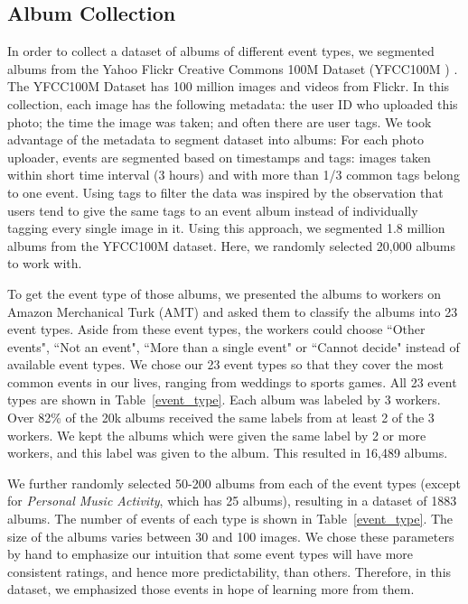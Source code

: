 \documentclass[10pt,twocolumn,letterpaper]{article}
\begin{document}
\subsection{Album Collection}
In order to collect a dataset of albums of different event types, we segmented albums from the Yahoo Flickr Creative Commons 100M Dataset (YFCC100M ) \cite{thomee2015yfcc100m}. The YFCC100M Dataset has 100 million images and videos from Flickr. In this collection, each image has the following metadata: the user ID who uploaded this photo; the time the image was taken; and often there are user tags. We took advantage of the metadata to segment dataset into albums: For each photo uploader, events are segmented based on timestamps and tags: images taken within short time interval (3 hours) and with more than 1/3 common tags belong to one event. Using tags to filter the data was inspired by the observation that users tend to give the same tags to an event album instead of individually tagging every single image in it. Using this approach, we segmented 1.8 million albums from the YFCC100M dataset. Here, we randomly selected 20,000 albums to work with. 

To get the event type of those albums, we presented the albums to workers on Amazon Merchanical Turk (AMT) and asked them to classify the albums into 23 event types. Aside from these event types, the workers could choose ``Other events", ``Not an event", ``More than a single event" or ``Cannot decide" instead of available event types. We chose our 23 event types so that they cover the most common events in our lives, ranging from weddings to sports games. %
All 23 event types are shown in Table~\ref{event_type}. Each album was labeled by 3 workers. Over 82\% of the 20k albums received the same labels from at least 2 of the 3 workers. 
We kept the albums which were given the same label by 2 or more workers, and this label was given to the album. This resulted in 16,489 albums.

We further randomly selected 50-200 albums from each of the event types (except for \textit{Personal Music Activity}, which has 25 albums), resulting in a dataset of 1883 albums. The number of events of each type is shown in Table~\ref{event_type}. The size of the albums varies between 30 and 100 images. We chose these parameters by hand to emphasize our intuition that some event types will have more consistent ratings, and hence more predictability, than others.  Therefore, in this dataset, we emphasized those events in hope of learning more from them.
\end{document}
